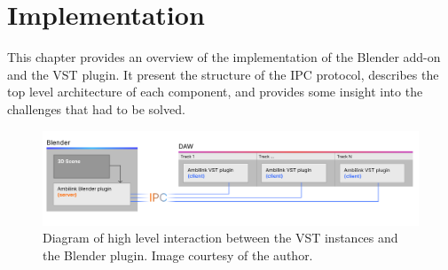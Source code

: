 
\chapter{Implementation}\label{chapter:implementation}

\begin{chapterabstract}
    This chapter provides an overview of the implementation of the Blender add-on and the VST plugin.
    It present the structure of the IPC protocol, describes the top level architecture of each component, 
    and provides some insight into the challenges that had to be solved.
\end{chapterabstract}

\begin{figure}[!h]
    \includegraphics[width=\textwidth]{images/implementation/plugin_interaction_diagram.png}
    \caption{Diagram of high level interaction between the VST instances and the Blender plugin.
        Image courtesy of the author. \label{fig:component_diagram}}
\end{figure}

